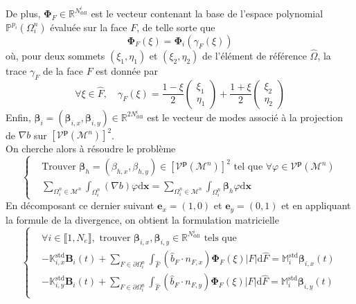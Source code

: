 \documentclass[11pt, a4paper, oneside]{report}
\begin{document}
De plus, $\bm{\Phi}_F \in \mathbb{R}^{N_\text{ddl}^i}$ est le vecteur contenant la base de l'espace polynomial $\mathbb{P}^{p_i}(\Omega_i^n)$ évaluée sur la face $F$, de telle sorte que
\begin{equation}
    \bm{\Phi}_F(\xi) = \bm{\Phi}_i \left( \gamma_F(\xi) \right)
\end{equation}
où, pour deux sommets $(\xi_1, \eta_1)$ et $(\xi_2, \eta_2)$ de l'élément de référence $\widehat{\Omega}$, la trace $\gamma_F$ de la face $F$ est donnée par
\begin{equation}
    \forall \xi \in \widehat{F}, \quad \gamma_F(\xi) = \frac{1-\xi}{2} \begin{pmatrix} \xi_1 \\ \eta_1 \end{pmatrix} + \frac{1+\xi}{2} \begin{pmatrix} \xi_2 \\ \eta_2 \end{pmatrix}
\end{equation}
Enfin, $\bm{\beta}_i = (\bm{\beta}_{i, x}, \bm{\beta}_{i, y}) \in \mathbb{R}^{2N_\text{ddl}^i}$ est le vecteur de modes associé à la projection de $\nabla b$ sur $\left[ \mathcal{V}^\mathbf{p}(\mathcal{M}^n) \right]^2$. \\
On cherche alors à résoudre le problème
\begin{equation}
    \left \{
    \begin{aligned}
        &\text{Trouver } \bm{\beta}_h = (\beta_{h, x}, \beta_{h, y}) \in \left[ \mathcal{V}^\mathbf{p}(\mathcal{M}^n) \right]^2 \text{ tel que } \forall \varphi \in \mathcal{V}^\mathbf{p}(\mathcal{M}^n) \\
        &\sum_{\Omega_i^n \in \mathcal{M}^n} \int_{\Omega_i^n} (\nabla b) \varphi \text{d}\bm{x} = \sum_{\Omega_i^n \in \mathcal{M}^n} \int_{\Omega_i^n} \bm{\beta}_h \varphi \text{d}\bm{x}
    \end{aligned}
    \right .
\end{equation}
En décomposant ce dernier suivant $\bm{e}_x = (1, 0)$ et $\bm{e}_y = (0, 1)$ et en appliquant la formule de la divergence, on obtient la formulation matricielle
\begin{equation} \label{eq:Beta_Exner_2D}
    \left \{
    \begin{aligned}
        & \forall i \in \llbracket 1, N_e \rrbracket, \text{ trouver } \bm{\beta}_{i, x}, \bm{\beta}_{i, y} \in \mathbb{R}^{N_\text{ddl}^i} \text{ tels que} \\
        & - \mathbb{K}_{i, x}^\text{std} \bm{B}_i(t) + \sum_{F \in \partial \Omega_i^n} \int_{\widehat{F}} \left( \widehat{b}_F \cdot n_{F, x} \right) \bm{\Phi}_F(\xi) \lvert F \rvert \text{d}\widehat{F} = \mathbb{M}_i^\text{std} \bm{\beta}_{i, x}(t) \\
        & - \mathbb{K}_{i, y}^\text{std} \bm{B}_i(t) + \sum_{F \in \partial \Omega_i^n} \int_{\widehat{F}} \left( \widehat{b}_F \cdot n_{F, y} \right) \bm{\Phi}_F(\xi) \lvert F \rvert \text{d}\widehat{F} = \mathbb{M}_i^\text{std} \bm{\beta}_{i, y}(t) \\
    \end{aligned}
    \right .
\end{equation}
\end{document}
